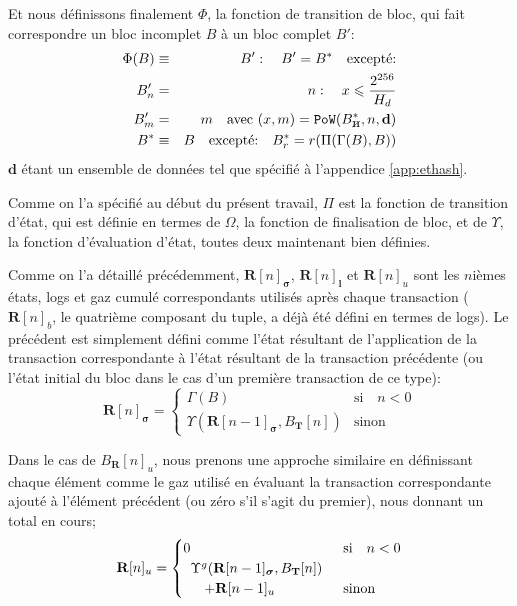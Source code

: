 \documentclass[9pt,oneside]{amsart}
\newcommand{\hcancel}[1]{%
    \tikz[baseline=(tocancel.base)]{
        \node[inner sep=0pt,outer sep=0pt] (tocancel) {#1};
        \draw[black] (tocancel.south west) -- (tocancel.north east);
    }%
}%
\begin{document}
\begin{multicols}{2}
Et nous définissons finalement $\Phi$, la fonction de transition de bloc, qui fait correspondre un bloc incomplet $B$ à un bloc complet $B'$:
\begin{eqnarray}
\Phi(B) & \equiv & B': \quad B' = B^* \quad \text{excepté:} \\
B'_n & = & n: \quad x \leqslant \frac{2^{256}}{H_d} \\
B'_m & = & m \quad \text{avec } (x, m) = \mathtt{PoW}(B^*_{\hcancel{n}}, n, \mathbf{d}) \\
B^* & \equiv & B \quad \text{excepté:} \quad B^*_r = r(\Pi(\Gamma(B), B))
\end{eqnarray}
$\mathbf{d}$ étant un ensemble de données tel que spécifié à l'appendice \ref{app:ethash}.

Comme on l'a spécifié au début du présent travail, $\Pi$ est la fonction de transition d'état, qui est définie en termes de $\Omega$, la fonction de finalisation de bloc, et de $\Upsilon$, la fonction d'évaluation d'état, toutes deux maintenant bien définies.

Comme on l'a détaillé précédemment, $\mathbf{R}[n]_{\boldsymbol{\sigma}}$, $\mathbf{R}[n]_\mathbf{l}$ et $\mathbf{R}[n]_u$ sont les $n$ièmes états, logs et gaz cumulé correspondants utilisés après chaque transaction ($\mathbf{R}[n]_b$, le quatrième composant du tuple, a déjà été défini en termes de logs). Le précédent  est simplement défini comme l'état résultant de l'application de la transaction correspondante à l'état résultant de la transaction précédente (ou l'état initial du bloc dans le cas d'un première transaction de ce type):
\begin{equation}
\mathbf{R}[n]_{\boldsymbol{\sigma}} = \begin{cases} \Gamma(B) & \text{si} \quad n < 0 \\ \Upsilon(\mathbf{R}[n - 1]_{\boldsymbol{\sigma}}, B_\mathbf{T}[n]) & \text{sinon} \end{cases}
\end{equation}

Dans le cas de $B_\mathbf{R}[n]_u$, nous prenons une approche similaire en définissant chaque élément comme le gaz utilisé en évaluant la transaction correspondante ajouté à l'élément précédent (ou zéro s'il s'agit du premier), nous donnant un total en cours;
\begin{equation}
\mathbf{R}[n]_u = \begin{cases} 0 & \text{si} \quad n < 0 \\
\begin{array}[b]{l}
\Upsilon^g(\mathbf{R}[n - 1]_{\boldsymbol{\sigma}}, B_\mathbf{T}[n])\\ \quad + \mathbf{R}[n-1]_u
\end{array}
 & \text{sinon} \end{cases}
\end{equation}


\end{multicols}
\end{document}
